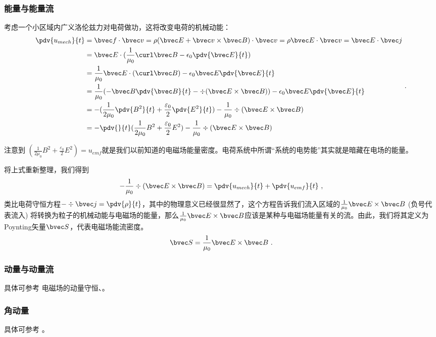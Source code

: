 \subsubsection{能量与能量流} 
考虑一个小区域内广义洛伦兹力对电荷做功，这将改变电荷的机械动能：
$$
\begin{aligned}
\pdv{u_{mech}}{t} &= \bvec f \cdot \bvec v = \rho (\bvec E + \bvec v \times \bvec B)\cdot \bvec v = \rho \bvec E \cdot \bvec v = \bvec E \cdot \bvec j \\
 & = \bvec E \cdot (\frac{1}{\mu_0} \curl \bvec B - \epsilon_0 \pdv{\bvec E}{t})\\
 & = \frac{1}{\mu_0} \bvec E \cdot (\curl \bvec B) - \epsilon_0 \bvec E \pdv{\bvec E}{t}\\
 & = \frac{1}{\mu_0} (-\bvec B \pdv{\bvec B}{t} - \div(\bvec E \times \bvec B))- \epsilon_0 \bvec E \pdv{\bvec E}{t}\\
 & = - (\frac{1}{2\mu_0} \pdv{B^2}{t} + \frac{\varepsilon_0}{2} \pdv{E^2}{t}) - \frac{1}{\mu_0} \div(\bvec E \times \bvec B)\\
 & = - \pdv{}{t} (\frac{1}{2\mu_0} B^2 + \frac{\varepsilon_0}{2} E^2) - \frac{1}{\mu_0} \div(\bvec E \times \bvec B)
\end{aligned}
~.
$$

注意到 $(\frac{1}{2\mu_0} B^2 + \frac{\varepsilon_0}{2} E^2) = u_{emf}$就是我们以前知道的电磁场能量密度。电荷系统中所谓“系统的电势能”其实就是暗藏在电场的能量。

将上式重新整理，我们得到
$$
- \frac{1}{\mu_0} \div(\bvec E \times \bvec B) = \pdv{u_{mech}}{t} + \pdv{u_{emf}}{t}~,
$$
类比电荷守恒方程$-\div \bvec j = \pdv{\rho}{t}$，其中的物理意义已经很显然了，这个方程告诉我们流入区域的$\frac{1}{\mu_0} \bvec E \times \bvec B$ (负号代表流入) 将转换为粒子的机械动能与电磁场的能量，那么$ \frac{1}{\mu_0} \bvec E \times \bvec B$应该是某种与电磁场能量有关的流。由此，我们将其定义为Poynting矢量$\bvec S$，代表电磁场能流密度。
$$
\bvec S = \frac{1}{\mu_0} \bvec E \times \bvec B~.
$$

\subsubsection{动量与动量流}
具体可参考 电磁场的动量守恒、。

\subsubsection{角动量}
具体可参考 \cite{GriffE}。
